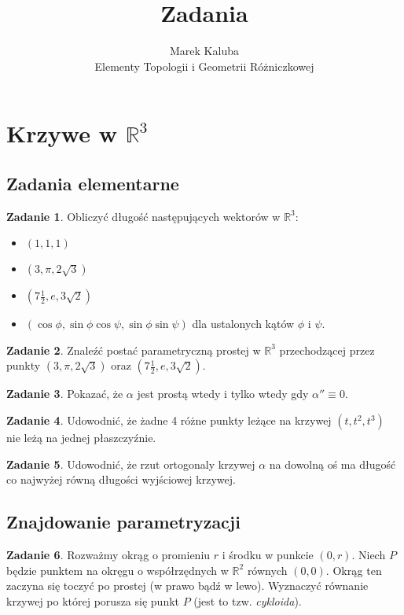 \documentclass[a4paper,11pt]{article}
\title{Zadania}
\author{Marek Kaluba\\Elementy Topologii i Geometrii Różniczkowej}
\theoremstyle{definition}\newtheorem{exercise}{Zadanie}
\theoremstyle{definition}\newtheorem{remark}{Uwaga}
\begin{document}
\section{Krzywe w $\mathbb{R}^3$}

\subsection{Zadania elementarne}

\begin{exercise}
 Obliczyć długość następujących wektor\'ow w $\mathbb{R}^3$:
\begin{itemize}
 \item $\left(1,1,1\right)$
 \item $\left(3,\pi,2\sqrt{3}\right)$
 \item $\left(7\frac{1}{2},e,3\sqrt{2}\right)$
 \item $\left(\cos \phi, \sin \phi \cos \psi, \sin\phi\sin\psi\right)$ dla 
ustalonych 
kąt\'ow $\phi$ i $\psi$.
 
\end{itemize}
\end{exercise}

\begin{exercise}
Znaleźć postać parametryczną prostej  w $\mathbb{R}^3$ przechodzącej
przez punkty $\left(3,\pi,2\sqrt{3}\right)$ oraz 
$\left(7\frac{1}{2},e,3\sqrt{2}\right)$.
\end{exercise}

\begin{exercise}
Pokazać, że $\alpha$ jest prostą wtedy i tylko wtedy gdy $\alpha''\equiv 0$.
\end{exercise}

\begin{exercise}
Udowodnić, że żadne 4 różne punkty leżące na krzywej $\left(t,t^2,t^3\right)$ 
nie leżą 
na jednej płaszczyźnie.
\end{exercise}

\begin{exercise}
Udowodnić, że rzut ortogonaly krzywej $\alpha$ na dowolną oś ma długość co 
najwyżej równą długości wyjściowej krzywej.
\end{exercise}

\subsection{Znajdowanie parametryzacji}

\begin{exercise}
Rozważmy okrąg o promieniu $r$ i środku w punkcie $(0,r)$. Niech $P$ będzie 
punktem na okręgu o wsp\'ołrzędnych w $\mathbb{R}^2$ r\'ownych $(0,0)$. Okrąg 
ten zaczyna się toczyć po prostej (w prawo bądź w lewo). Wyznaczyć r\'ownanie 
krzywej po kt\'orej porusza się punkt $P$ (jest to tzw. \textit{cykloida}).
\end{exercise}
\end{document}
